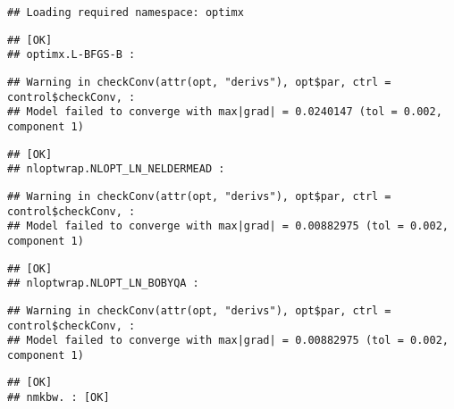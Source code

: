 \documentclass[
]{article}
\begin{document}
\begin{verbatim}
## Loading required namespace: optimx
\end{verbatim}

\begin{verbatim}
## [OK]
## optimx.L-BFGS-B :
\end{verbatim}

\begin{verbatim}
## Warning in checkConv(attr(opt, "derivs"), opt$par, ctrl = control$checkConv, :
## Model failed to converge with max|grad| = 0.0240147 (tol = 0.002, component 1)
\end{verbatim}

\begin{verbatim}
## [OK]
## nloptwrap.NLOPT_LN_NELDERMEAD :
\end{verbatim}

\begin{verbatim}
## Warning in checkConv(attr(opt, "derivs"), opt$par, ctrl = control$checkConv, :
## Model failed to converge with max|grad| = 0.00882975 (tol = 0.002, component 1)
\end{verbatim}

\begin{verbatim}
## [OK]
## nloptwrap.NLOPT_LN_BOBYQA :
\end{verbatim}

\begin{verbatim}
## Warning in checkConv(attr(opt, "derivs"), opt$par, ctrl = control$checkConv, :
## Model failed to converge with max|grad| = 0.00882975 (tol = 0.002, component 1)
\end{verbatim}

\begin{verbatim}
## [OK]
## nmkbw. : [OK]
\end{verbatim}
\end{document}
